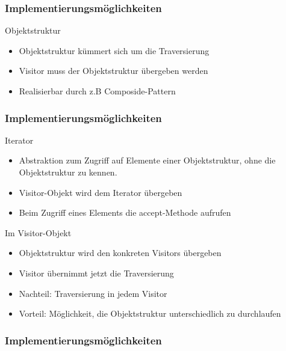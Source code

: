 \begin{frame}
	\frametitle{Implementierungsmöglichkeiten}
  \begin{block}{Objektstruktur}
  	\begin{itemize}
  		\item Objektstruktur kümmert sich um die Traversierung 
  		\item Visitor muss der Objektstruktur übergeben werden
  		\item Realisierbar durch z.B Composide-Pattern
  	\end{itemize}
  \end{block}
\end{frame}

\begin{frame}
	\frametitle{Implementierungsmöglichkeiten}
  \begin{block}{Iterator}
  	\begin{itemize}
  		\item Abstraktion zum Zugriff auf Elemente einer Objektstruktur, ohne die  Objektstruktur zu kennen.
  		\item Visitor-Objekt wird dem Iterator übergeben
  		\item Beim Zugriff eines Elements die accept-Methode aufrufen

  	\end{itemize}
  \end{block}
	\begin{block}{Im Visitor-Objekt}
  	\begin{itemize}
  		\item Objektstruktur wird den konkreten Visitors übergeben
  		\item Visitor übernimmt jetzt die Traversierung
  		\item Nachteil: Traversierung in jedem Visitor
  		\item Vorteil: Möglichkeit, die Objektstruktur unterschiedlich zu durchlaufen
  	\end{itemize}
  \end{block}
\end{frame}


\begin{frame}
	\frametitle{Implementierungsmöglichkeiten}

\end{frame}

